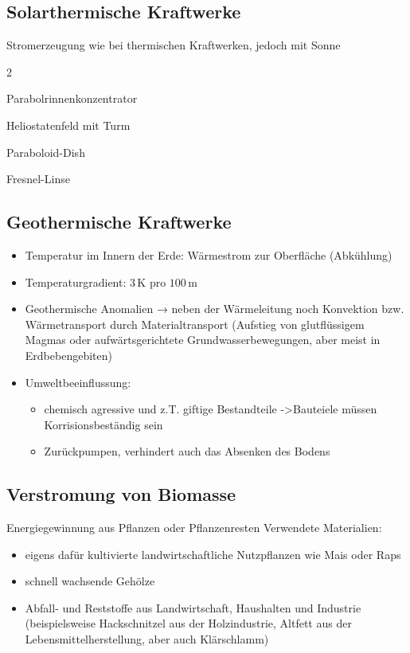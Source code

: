 \subsection{Solarthermische Kraftwerke}
    Stromerzeugung wie bei thermischen Kraftwerken, jedoch mit Sonne
    \vspace{-4mm}
    \def\columnseprulecolor{\color{white}}
    \begin{enumerate}
        \begin{multicols}{2}
            \item Parabolrinnenkonzentrator
            \item Heliostatenfeld mit Turm
            \item Paraboloid-Dish
            \item Fresnel-Linse
        \end{multicols}
    \end{enumerate}
    \def\columnseprulecolor{\color{black}}
    \vspace{-4mm}

\subsection{Geothermische Kraftwerke}
\begin{itemize}
    \item Temperatur im Innern der Erde:  Wärmestrom zur Oberfläche (Abkühlung)
    \item Temperaturgradient: $3\, \mathrm{K}$ pro $100\, \mathrm{m}$
    \item Geothermische Anomalien → neben der Wärmeleitung noch Konvektion bzw. Wärmetransport durch Materialtransport (Aufstieg von glutflüssigem Magmas oder aufwärtsgerichtete Grundwasserbewegungen, aber meist in Erdbebengebiten)
    \item Umweltbeeinflussung:
    \begin{itemize}
        \item chemisch agressive und z.T. giftige Bestandteile ->Bauteiele müssen Korrisionsbeständig sein
        \item Zurückpumpen, verhindert auch das Absenken des Bodens
    \end{itemize}
\end{itemize}

\subsection{Verstromung von Biomasse}
Energiegewinnung aus Pflanzen oder Pflanzenresten
Verwendete Materialien:
\begin{itemize}
    \item eigens dafür kultivierte landwirtschaftliche Nutzpflanzen wie Mais oder Raps
    \item schnell wachsende Gehölze
    \item Abfall- und Reststoffe aus Landwirtschaft, Haushalten und Industrie (beispielsweise Hackschnitzel aus der
Holzindustrie, Altfett aus der Lebensmittelherstellung, aber auch Klärschlamm)

\end{itemize}

\newcolumn